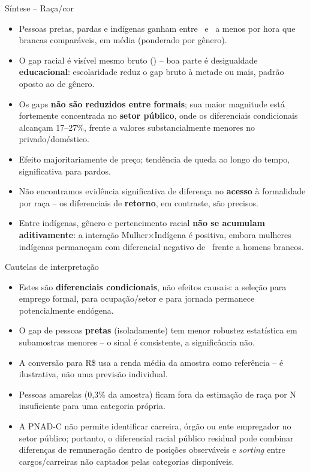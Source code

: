 \documentclass[aspectratio=169]{beamer}
\newcommand{\highlight}[1]{\textcolor{accentblue}{\textbf{#1}}}
\begin{document}
\begin{frame}{S\'intese -- Ra\c{c}a/cor}
  \footnotesize
  \begin{itemize}
    \item Pessoas pretas, pardas e ind\'igenas ganham entre \PctPretoInformal\ e \PctIndigenaInformal\ a menos por hora que brancas compar\'aveis, em m\'edia (ponderado por g\^enero).
    \item O gap racial \'e vis\'ivel mesmo bruto (\BrutoGapRacaPct) -- boa parte \'e desigualdade \highlight{educacional}: escolaridade reduz o gap bruto \`a metade ou mais, padr\~ao oposto ao de g\^enero.
    \item Os gaps \highlight{n\~ao s\~ao reduzidos entre formais}; sua maior magnitude est\'a fortemente concentrada no \highlight{setor p\'ublico}, onde os diferenciais condicionais alcan\c{c}am 17--27\%, frente a valores substancialmente menores no privado/dom\'estico.
    \item Efeito majoritariamente de pre\c{c}o; tend\^encia de queda ao longo do tempo, significativa para pardos.
    \item N\~ao encontramos evid\^encia significativa de diferen\c{c}a no \highlight{acesso} \`a formalidade por ra\c{c}a -- os diferenciais de \highlight{retorno}, em contraste, s\~ao precisos.
    \item Entre ind\'igenas, g\^enero e pertencimento racial \highlight{n\~ao se acumulam aditivamente}: a intera\c{c}\~ao Mulher$\times$Ind\'igena \'e positiva, embora mulheres ind\'igenas permane\c{c}am com diferencial negativo de \PctInterseccMulherIndigena\ frente a homens brancos.
  \end{itemize}
\end{frame}

\begin{frame}{Cautelas de interpreta\c{c}\~ao}
  \begin{itemize}
    \item Estes s\~ao \highlight{diferenciais condicionais}, n\~ao efeitos causais: a sele\c{c}\~ao para emprego formal, para ocupa\c{c}\~ao/setor e para jornada permanece potencialmente end\'ogena.
    \item O gap de pessoas \highlight{pretas} (isoladamente) tem menor robustez estat\'istica em subamostras menores -- o sinal \'e consistente, a signific\^ancia n\~ao.
    \item A convers\~ao para R\$ usa a renda m\'edia da amostra como refer\^encia -- \'e ilustrativa, n\~ao uma previs\~ao individual.
    \item Pessoas amarelas (0,3\% da amostra) ficam fora da estima\c{c}\~ao de ra\c{c}a por N insuficiente para uma categoria pr\'opria.
    \item A PNAD-C n\~ao permite identificar carreira, \'org\~ao ou ente empregador no setor p\'ublico; portanto, o diferencial racial p\'ublico residual pode combinar diferen\c{c}as de remunera\c{c}\~ao dentro de posi\c{c}\~oes observ\'aveis e \emph{sorting} entre cargos/carreiras n\~ao captados pelas categorias dispon\'iveis.
  \end{itemize}
\end{frame}
\end{document}
